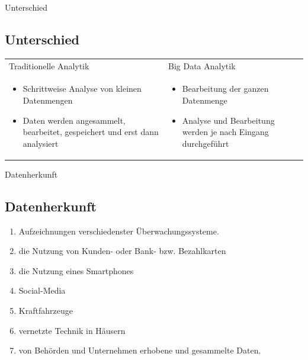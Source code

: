 \documentclass[11pt]{beamer}
\begin{document}
\begin{frame}{Unterschied}
\subsection{Unterschied}
\setlength\tabcolsep{0pt}
\setlength\thickmuskip{0mu}
\setlength\medmuskip{0mu}
\small
\centering
\begin{tabular*}{\textwidth}{ p{145pt} p{145pt}} 
Traditionelle Analytik & Big Data Analytik \\ 
\begin{itemize}
\item Schrittweise Analyse von kleinen Datenmengen
\item Daten werden angesammelt, bearbeitet, gespeichert und erst dann analysiert 
\end{itemize}
&
\begin{itemize}
\item Bearbeitung der ganzen Datenmenge 
\item Analyse und Bearbeitung werden je nach Eingang durchgeführt 
\end{itemize}

\end{tabular*} 
\end{frame}

\begin{frame}{Datenherkunft}
\subsection{Datenherkunft}
\begin{enumerate}
\item Aufzeichnungen verschiedenster Überwachungssysteme.
\item die Nutzung von Kunden- oder Bank- bzw. Bezahlkarten 
\item die Nutzung eines Smartphones
\item Social-Media
\item Kraftfahrzeuge
\item vernetzte Technik in Häusern
\item von Behörden und Unternehmen erhobene und gesammelte Daten.
\end{enumerate}
\end{frame}
\end{document}
